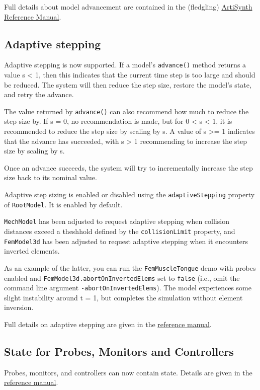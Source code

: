 \documentclass{article}
\begin{document}
Full details about model advancement are contained in the (fledgling)
\href{http://www.artisynth.org/doc/html/artisynth/artisynth.html}{ArtiSynth
Reference Manual}.

\subsection*{Adaptive stepping}

Adaptive stepping is now supported. If a model's {\tt advance()} method
returns a value s < 1, then this indicates that the current time step
is too large and should be reduced. The system will then reduce the
step size, restore the model's state, and retry the advance. 

The value returned by {\tt advance()} can also recommend how much to reduce
the step size by. If s = 0, no recommendation is made, but for 0 < s < 1,
it is recommended to reduce the step size by scaling by s. A value of s >= 1 indicates
that the advance has succeeded, with s > 1 recommending to increase the step
size by scaling by s.

Once an advance succeeds, the system will try to incrementally
increase the step size back to its nominal value.

Adaptive step sizing is enabled or disabled using the
{\tt adaptiveStepping} property of {\tt RootModel}. It is enabled by default.

{\tt MechModel} has been adjusted to request adaptive stepping when
collision distances exceed a theshhold defined by the {\tt col\-lisionLimit}
property, and {\tt FemModel3d} has been adjusted to request adaptive
stepping when it encounters inverted elements.

As an example of the latter, you can run the {\tt FemMuscleTongue} demo
with probes enabled and {\tt FemModel3d.abortOnInvert\-edElems} set to
{\tt false} (i.e., omit the command line argument
{\tt -abortOnInvertedElems}). The model experiences some slight
instability around t = 1, but completes the simulation without element
inversion.

Full details on adaptive stepping are given in the
\href{http://www.artisynth.org/doc/html/artisynth/artisynth.html#AdaptiveStepping}%
{reference manual}.

\subsection*{State for Probes, Monitors and Controllers}

Probes, monitors, and controllers can now contain state. Details are
given in the
\href{http://www.artisynth.org/doc/html/artisynth/artisynth.html#ModelAgentState}%
{reference manual}.
\end{document}
